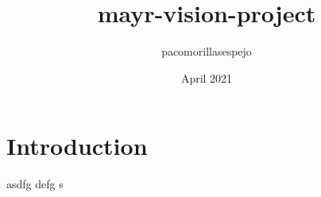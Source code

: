 \documentclass{article}
\title{mayr-vision-project}
\author{pacomorillasespejo }
\date{April 2021}
\begin{document}
\maketitle

\section{Introduction}
asdfg defg s
\end{document}
